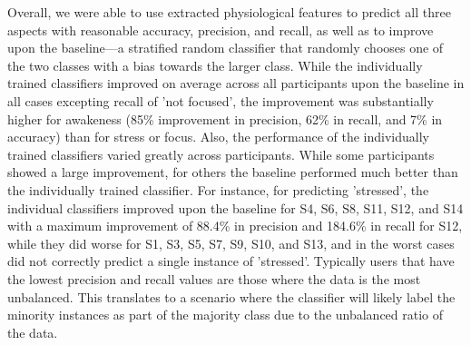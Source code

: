 

Overall, we were able to use extracted physiological features to
predict all three aspects with reasonable accuracy, precision, and
recall, as well as to improve upon the baseline---a stratified random
classifier that randomly chooses one of the two classes with a bias
towards the larger class. While the individually trained classifiers
improved on average across all participants upon the baseline in all
cases excepting recall of 'not focused', the improvement was
substantially higher for awakeness (85\% improvement in precision,
62\% in recall, and 7\% in accuracy) than for stress or focus. Also,
the performance of the individually trained classifiers varied greatly
across participants. While some participants showed a large
improvement, for others the baseline performed much better than the
individually trained classifier. For instance, for predicting
'stressed', the individual classifiers improved upon the baseline for
S4, S6, S8, S11, S12, and S14 with a maximum improvement of 88.4\% in
precision and 184.6\% in recall for S12, while they did worse for S1,
S3, S5, S7, S9, S10, and S13, and in the worst cases did not correctly
predict a single instance of 'stressed'. Typically users that have the
lowest precision and recall values are those where the data is the
most unbalanced. This translates to a scenario where the classifier
will likely label the minority instances as part of the majority class
due to the unbalanced ratio of the data.\\[-0.1cm]
%
